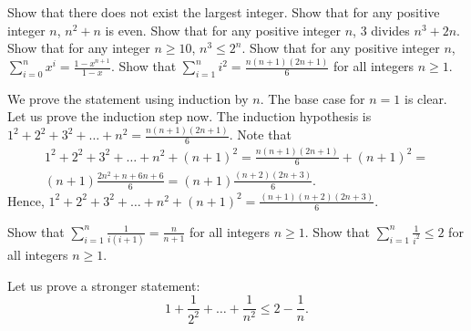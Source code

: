 \begin{exercise}
\label{exercise:selection-sort}
\end{exercise}
\begin{chapterendexercises}
  \exercise Show that there does not exist the largest integer.
  \exercise[recommended] Show that for any positive integer $n$, $n^2 + n$ is even.
  \exercise Show that for any positive integer $n$, $3$ divides $n^3 + 2n$.
  \exercise Show that for any integer $n \ge 10$, $n^3 \le 2^n$.
  \exercise Show that for any positive integer $n$,
    $\sum_{i = 0}^n x^i = \frac{1 - x^{n + 1}}{1 - x}$.
  \exercise[recommended] Show that $\sum_{i = 1}^n i^2 = 
    \frac{n (n + 1)(2n + 1)}{6}$ for all integers $n \ge 1$.
    \begin{solution}
      We prove the statement using induction by $n$. The base case for $n = 1$
      is clear. Let us prove the induction step now. The induction hypothesis is
      $1^2 + 2^2 + 3^2 + \dots + n^2 = \frac{n (n + 1)(2n + 1)}{6}$. 
      Note that
      \begin{multline*}
        1^2 + 2^2 + 3^2 + \dots + n^2 + (n + 1)^2 = \frac{n (n + 1)(2n + 1)}{6} +
        (n + 1)^2 = \\
        (n + 1)\frac{2n^2 + n + 6n + 6}{6} = (n + 1)\frac{(n + 2)(2n + 3)}{6}.
      \end{multline*}
      Hence, $1^2 + 2^2 + 3^2 + \dots + n^2 + (n + 1)^2 = 
      \frac{(n + 1)(n + 2)(2n + 3)}{6}$.
    \end{solution}
  \exercise Show that $\sum_{i = 1}^n \frac{1}{i (i + 1)} = 
    \frac{n}{n + 1}$ for all integers $n \ge 1$.
  \exercise Show that $\sum_{i = 1}^n \frac{1}{i^2} \le 2$ for all integers 
    $n \ge 1$.
    \begin{solution}
      Let us prove a stronger statement:
      \[
        1 + \frac{1}{2^2} + \dots + \frac{1}{n^2} \le 2 - \frac{1}{n}.
      \]


\end{solution}
\end{chapterendexercises}
